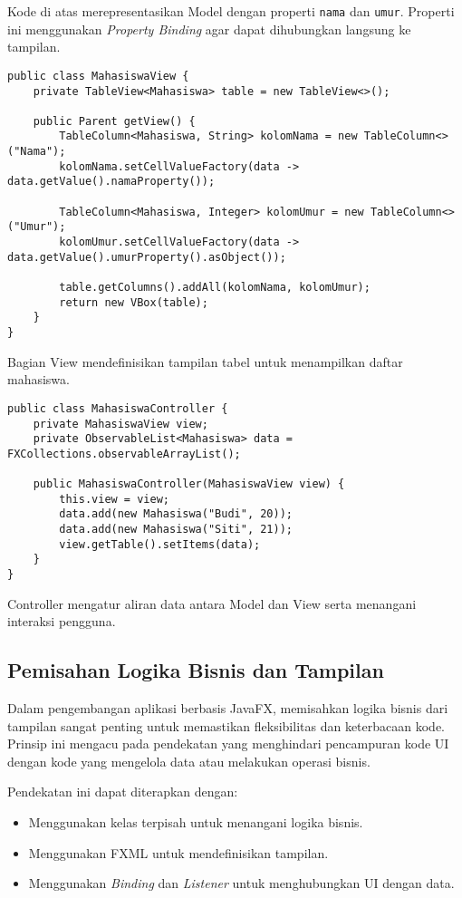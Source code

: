 Kode di atas merepresentasikan Model dengan properti \texttt{nama} dan \texttt{umur}. Properti ini menggunakan \textit{Property Binding} agar dapat dihubungkan langsung ke tampilan.

\begin{lstlisting}[style=JavaStyle, caption=View dalam aplikasi JavaFX]
public class MahasiswaView {
	private TableView<Mahasiswa> table = new TableView<>();
	
	public Parent getView() {
		TableColumn<Mahasiswa, String> kolomNama = new TableColumn<>("Nama");
		kolomNama.setCellValueFactory(data -> data.getValue().namaProperty());
		
		TableColumn<Mahasiswa, Integer> kolomUmur = new TableColumn<>("Umur");
		kolomUmur.setCellValueFactory(data -> data.getValue().umurProperty().asObject());
		
		table.getColumns().addAll(kolomNama, kolomUmur);
		return new VBox(table);
	}
}
\end{lstlisting}

Bagian View mendefinisikan tampilan tabel untuk menampilkan daftar mahasiswa.

\begin{lstlisting}[style=JavaStyle, caption=Controller dalam aplikasi JavaFX]
public class MahasiswaController {
	private MahasiswaView view;
	private ObservableList<Mahasiswa> data = FXCollections.observableArrayList();
	
	public MahasiswaController(MahasiswaView view) {
		this.view = view;
		data.add(new Mahasiswa("Budi", 20));
		data.add(new Mahasiswa("Siti", 21));
		view.getTable().setItems(data);
	}
}
\end{lstlisting}

Controller mengatur aliran data antara Model dan View serta menangani interaksi pengguna.

\subsection{Pemisahan Logika Bisnis dan Tampilan}

Dalam pengembangan aplikasi berbasis JavaFX, memisahkan logika bisnis dari tampilan sangat penting untuk memastikan fleksibilitas dan keterbacaan kode. Prinsip ini mengacu pada pendekatan yang menghindari pencampuran kode UI dengan kode yang mengelola data atau melakukan operasi bisnis.

Pendekatan ini dapat diterapkan dengan:
\begin{itemize}
\item Menggunakan kelas terpisah untuk menangani logika bisnis.
\item Menggunakan FXML untuk mendefinisikan tampilan.
\item Menggunakan \textit{Binding} dan \textit{Listener} untuk menghubungkan UI dengan data.
\end{itemize}

